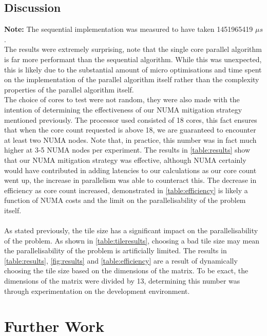 \documentclass[manuscript,screen, nonacm=true]{acmart}
\begin{document}
\subsection{Discussion}
\textbf{Note: } The sequential implementation was measured to have taken 1451965419 $\mu s$.
\vspace{2mm}
\\
The results were extremely surprising, note that the single core parallel algorithm is far more performant than the sequential algorithm. While this was unexpected, this is likely due to the substantial amount of micro optimisations and time spent on the implementation of the parallel algorithm itself rather than the complexity properties of the parallel algorithm itself. 
\vspace{2mm}
\\
The choice of cores to test were not random, they were also made with the intention of determining the effectiveness of our NUMA mitigation strategy mentioned previously. The processor used consisted of 18 cores, this fact ensures that when the core count requested is above 18, we are guaranteed to encounter at least two NUMA nodes. Note that, in practice, this number was in fact much higher at 3-5 NUMA nodes per experiment. The results in \cref{table:results} show that our NUMA mitigation strategy was effective, although NUMA certainly would have contributed in adding latencies to our calculations as our core count went up, the increase in parallelism was able to counteract this. The decrease in efficiency as core count increased,  demonstrated in \cref{table:efficiency} is likely a function of NUMA costs and the limit on the parallelisability of the problem itself. 
\\
\\
As stated previously, the tile size has a significant impact on the parallelisability of the problem. As shown in \cref{table:tileresults}, choosing a bad tile size may mean the parallelisability of the problem is artificially limited. The results in \cref{table:results}, \cref{fig:results} and \cref{table:efficiency} are a result of dynamically choosing the tile size based on the dimensions of the matrix. To be exact, the dimensions of the matrix were divided by 13, determining this number was through experimentation on the development environment. 

\section{Further Work}
\end{document}
